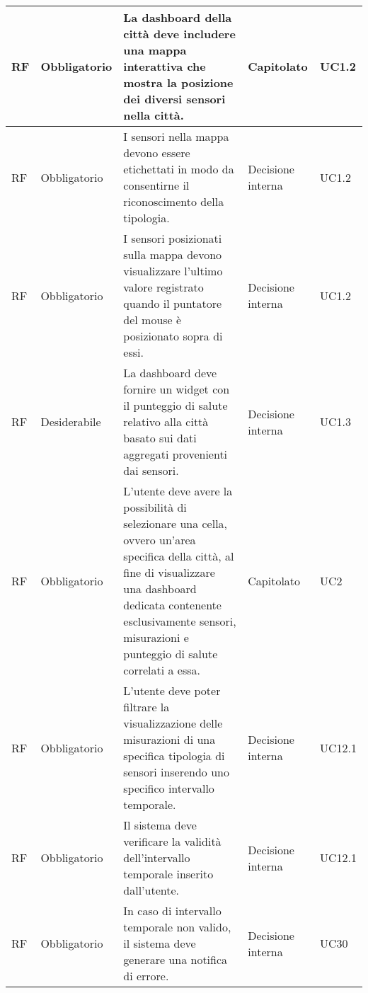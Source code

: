 \begin{longtable}{|C{1.5cm}|C{2cm}|L{5cm}|C{2cm}|C{1.5cm}|}
    \hline
     RF & Obbligatorio & La dashboard della città deve includere una mappa interattiva che mostra la posizione dei diversi sensori nella città. & Capitolato & UC1.2 \\
    
    \hline
     RF & Obbligatorio & I sensori nella mappa devono essere etichettati in modo da consentirne il riconoscimento della tipologia. & Decisione interna & UC1.2 \\
    
    \hline
     RF & Obbligatorio &  I sensori posizionati sulla mappa devono visualizzare l'ultimo valore registrato quando il puntatore del mouse è posizionato sopra di essi. & Decisione interna & UC1.2 \\
    
    \hline
     RF & Desiderabile & La dashboard deve fornire un widget con il punteggio di salute relativo alla città basato sui dati aggregati provenienti dai sensori. & Decisione interna & UC1.3 \\
    
    \hline
     RF & Obbligatorio & L'utente deve avere la possibilità di selezionare una cella, ovvero un'area specifica della città, al fine di visualizzare una dashboard dedicata contenente esclusivamente sensori, misurazioni e punteggio di salute correlati a essa. & Capitolato & UC2 \\
    
    \hline
     RF & Obbligatorio & L'utente deve poter filtrare la visualizzazione delle misurazioni di una specifica tipologia di sensori inserendo uno specifico intervallo temporale. & Decisione interna & UC12.1 \\
    
    \hline
     RF & Obbligatorio & Il sistema deve verificare la validità dell'intervallo temporale inserito dall'utente. & Decisione interna & UC12.1 \\
    
    \hline
     RF & Obbligatorio & In caso di intervallo temporale non valido, il sistema deve generare una notifica di errore. & Decisione interna & UC30 \\
    

\end{longtable}
